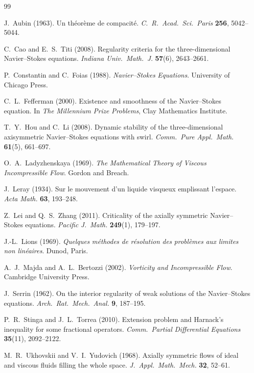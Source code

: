 \documentclass{article}
\theoremstyle{definition}
\theoremstyle{remark}
\begin{document}
\begin{thebibliography}{99}

J.~Aubin (1963).
Un th\'{e}or\`{e}me de compacit\'{e}.
\textit{C.\ R.\ Acad.\ Sci.\ Paris} \textbf{256}, 5042--5044.

C.~Cao and E.~S.~Titi (2008).
Regularity criteria for the three-dimensional Navier--Stokes equations.
\textit{Indiana Univ.\ Math.\ J.} \textbf{57}(6), 2643--2661.

P.~Constantin and C.~Foias (1988).
\textit{Navier--Stokes Equations}.
University of Chicago Press.

C.~L.~Fefferman (2000).
Existence and smoothness of the Navier--Stokes equation.
In \textit{The Millennium Prize Problems}, Clay Mathematics Institute.

T.~Y.~Hou and C.~Li (2008).
Dynamic stability of the three-dimensional axisymmetric Navier--Stokes
equations with swirl.
\textit{Comm.\ Pure Appl.\ Math.} \textbf{61}(5), 661--697.

O.~A.~Ladyzhenskaya (1969).
\textit{The Mathematical Theory of Viscous Incompressible Flow}.
Gordon and Breach.

J.~Leray (1934).
Sur le mouvement d'un liquide visqueux emplissant l'espace.
\textit{Acta Math.} \textbf{63}, 193--248.

Z.~Lei and Q.~S.~Zhang (2011).
Criticality of the axially symmetric Navier--Stokes equations.
\textit{Pacific J.\ Math.} \textbf{249}(1), 179--197.

J.-L.~Lions (1969).
\textit{Quelques m\'{e}thodes de r\'{e}solution des probl\`{e}mes aux
limites non lin\'{e}aires}.
Dunod, Paris.

A.~J.~Majda and A.~L.~Bertozzi (2002).
\textit{Vorticity and Incompressible Flow}.
Cambridge University Press.

J.~Serrin (1962).
On the interior regularity of weak solutions of the Navier--Stokes
equations.
\textit{Arch.\ Rat.\ Mech.\ Anal.} \textbf{9}, 187--195.

P.~R.~Stinga and J.~L.~Torrea (2010).
Extension problem and Harnack's inequality for some fractional operators.
\textit{Comm.\ Partial Differential Equations}
\textbf{35}(11), 2092--2122.

M.~R.~Ukhovskii and V.~I.~Yudovich (1968).
Axially symmetric flows of ideal and viscous fluids filling the whole space.
\textit{J.\ Appl.\ Math.\ Mech.} \textbf{32}, 52--61.

\end{thebibliography}
\end{document}
